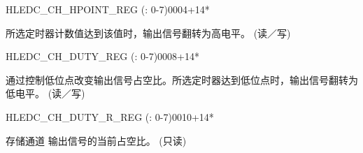\begin{register}{H}{LEDC\_CH\_HPOINT\_REG (: 0-7)}{\hexprefix{}0004+\hexprefix{}14*}\label{regdesc:LEDCCHNHPOINTREG}
%
%
\regnewline%
\begin{regdesc}\begin{reglist}
\label{fielddesc:LEDCHPOINTCHN}\item [LEDC\_HPOINT\_CH\regindex{n}] 所选定时器计数值达到该值时，输出信号翻转为高电平。 (读／写)
\end{reglist}\end{regdesc}
\end{register}


\begin{register}{H}{LEDC\_CH\_DUTY\_REG (: 0-7)}{\hexprefix{}0008+\hexprefix{}14*}\label{regdesc:LEDCCHNDUTYREG}
%
%
\regnewline%
\begin{regdesc}\begin{reglist}
\label{fielddesc:LEDCDUTYCHN}\item [LEDC\_DUTY\_CH\regindex{n}] 通过控制低位点改变输出信号占空比。所选定时器达到低位点时，输出信号翻转为低电平。 (读／写)
\end{reglist}\end{regdesc}
\end{register}


\begin{register}{H}{LEDC\_CH\_DUTY\_R\_REG (: 0-7)}{\hexprefix{}0010+\hexprefix{}14*}\label{regdesc:LEDCCHNDUTYRREG}
%
%
\regnewline%
\begin{regdesc}\begin{reglist}
\label{fielddesc:LEDCDUTYRCHN}\item [LEDC\_DUTY\_R\_CH\regindex{n}] 存储通道  输出信号的当前占空比。 (只读)
\end{reglist}\end{regdesc}
\end{register}


